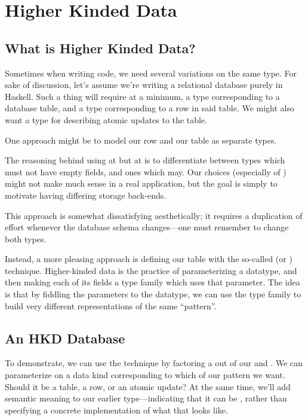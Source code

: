 \documentclass[book.tex]{subfiles}
\begin{document}
\chapter{Higher Kinded Data}

\section{What is Higher Kinded Data?}


Sometimes when writing code, we need several variations on the same type.
For sake of discussion, let's assume we're writing a relational database purely
in Haskell. Such a thing will require at a minimum, a type corresponding to a
database table, and a type corresponding to a row in said table. We might also
want a type for describing atomic updates to the table.

One approach might be to model our row and our table as separate types.


The reasoning behind using  at  but  at  is to
differentiate between types which must not have empty fields, and ones which
may. Our choices (especially of ) might not make much sense in a real
application, but the goal is simply to motivate having differing storage
back-ends.

This approach is somewhat dissatisfying aesthetically; it requires a duplication
of effort whenever the database schema changes---one must remember to change
both types.

Instead, a more pleasing approach is defining our table with the  so-called
 (or ) technique. Higher-kinded data is the
practice of parameterizing a datatype, and then making each of its fields a type
family which uses that parameter. The idea is that by fiddling the parameters to
the datatype, we can use the type family to build very different representations
of the same ``pattern''.


\section{An HKD Database}

To demonstrate, we can use the technique by factoring a  out
of our  and . We can parameterize
 on a data kind corresponding to which  of
our pattern we want. Should it be a table, a row, or an atomic update? At the
same time, we'll add semantic meaning to our earlier 
type---indicating that it can be , rather than specifying a
concrete implementation of what that looks like.
\end{document}
